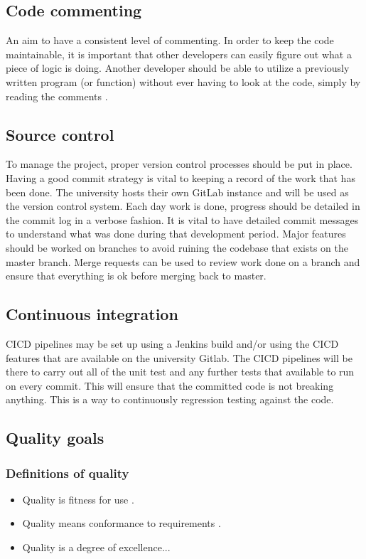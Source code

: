 \subsection{Code commenting}
An aim to have a consistent level of commenting. In order to keep the code maintainable, it is
important that other developers can easily figure out what a piece of logic is doing. Another developer should be
able to utilize a previously written program (or function) without ever having to look at the code, simply
by reading the comments \cite{germain2010commenting}.

\subsection{Source control}
To manage the project, proper version control processes should be put in place.
Having a good commit strategy is vital to keeping a record of the work that has been done.
The university hosts their own GitLab instance and will be used as the version control system.
Each day work is done, progress should be detailed in the commit log in a verbose fashion.
It is vital to have detailed commit messages to understand what was done during that development period.
Major features should be worked on branches to avoid ruining the codebase that exists on the master branch.
Merge requests can be used to review work done on a branch and ensure that everything is ok before merging back to master.


\subsection{Continuous integration}
CICD pipelines may be set up using a Jenkins build and/or using the CICD features that are available on
the university Gitlab. The CICD pipelines will be there to carry out all of the unit test and any further
tests that available to run on every commit. This will ensure that the committed code is not breaking
anything. This is a way to continuously regression testing against the code.


\subsection{Quality goals}

\subsubsection{Definitions of quality}
\begin{itemize}
    \tightlist
    \item Quality is fitness for use \cite{asq2005qualityglossary}.
    \item Quality means conformance to requirements \cite{morgan1994total}.
    \item Quality is a degree of excellence...\cite{merriam2007qualitydefinition}
\end{itemize}

